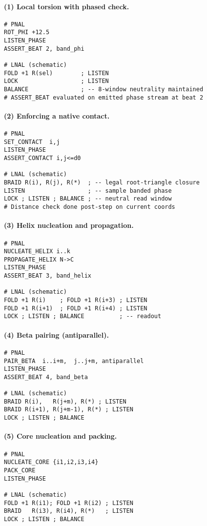 \documentclass[12pt,a4paper]{article}
\begin{document}
\paragraph{(1) Local torsion with phased check.}
\begin{verbatim}
# PNAL
ROT_PHI +12.5
LISTEN_PHASE
ASSERT_BEAT 2, band_phi

# LNAL (schematic)
FOLD +1 R(sel)        ; LISTEN
LOCK                  ; LISTEN
BALANCE               ; -- 8-window neutrality maintained
# ASSERT_BEAT evaluated on emitted phase stream at beat 2
\end{verbatim}

\paragraph{(2) Enforcing a native contact.}
\begin{verbatim}
# PNAL
SET_CONTACT  i,j
LISTEN_PHASE
ASSERT_CONTACT i,j<=d0

# LNAL (schematic)
BRAID R(i), R(j), R(*)  ; -- legal root-triangle closure
LISTEN                  ; -- sample banded phase
LOCK ; LISTEN ; BALANCE ; -- neutral read window
# Distance check done post-step on current coords
\end{verbatim}

\paragraph{(3) Helix nucleation and propagation.}
\begin{verbatim}
# PNAL
NUCLEATE_HELIX i..k
PROPAGATE_HELIX N->C
LISTEN_PHASE
ASSERT_BEAT 3, band_helix

# LNAL (schematic)
FOLD +1 R(i)    ; FOLD +1 R(i+3) ; LISTEN
FOLD +1 R(i+1)  ; FOLD +1 R(i+4) ; LISTEN
LOCK ; LISTEN ; BALANCE          ; -- readout
\end{verbatim}

\paragraph{(4) Beta pairing (antiparallel).}
\begin{verbatim}
# PNAL
PAIR_BETA  i..i+m,  j..j+m, antiparallel
LISTEN_PHASE
ASSERT_BEAT 4, band_beta

# LNAL (schematic)
BRAID R(i),   R(j+m), R(*) ; LISTEN
BRAID R(i+1), R(j+m-1), R(*) ; LISTEN
LOCK ; LISTEN ; BALANCE
\end{verbatim}

\paragraph{(5) Core nucleation and packing.}
\begin{verbatim}
# PNAL
NUCLEATE_CORE {i1,i2,i3,i4}
PACK_CORE
LISTEN_PHASE

# LNAL (schematic)
FOLD +1 R(i1); FOLD +1 R(i2) ; LISTEN
BRAID   R(i3), R(i4), R(*)   ; LISTEN
LOCK ; LISTEN ; BALANCE
\end{verbatim}
\end{document}
